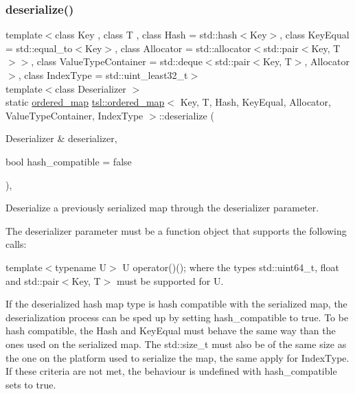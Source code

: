 \subsubsection{\texorpdfstring{deserialize()}{deserialize()}}
{\footnotesize\ttfamily template$<$class Key , class T , class Hash  = std\+::hash$<$\+Key$>$, class Key\+Equal  = std\+::equal\+\_\+to$<$\+Key$>$, class Allocator  = std\+::allocator$<$std\+::pair$<$\+Key, T$>$$>$, class Value\+Type\+Container  = std\+::deque$<$std\+::pair$<$\+Key, T$>$, Allocator$>$, class Index\+Type  = std\+::uint\+\_\+least32\+\_\+t$>$ \\
template$<$class Deserializer $>$ \\
static \mbox{\hyperlink{classtsl_1_1ordered__map}{ordered\+\_\+map}} \mbox{\hyperlink{classtsl_1_1ordered__map}{tsl\+::ordered\+\_\+map}}$<$ Key, T, Hash, Key\+Equal, Allocator, Value\+Type\+Container, Index\+Type $>$\+::deserialize (\begin{DoxyParamCaption}\item[{Deserializer \&}]{deserializer,  }\item[{bool}]{hash\+\_\+compatible = {\ttfamily false} }\end{DoxyParamCaption})\hspace{0.3cm}{\ttfamily [inline]}, {\ttfamily [static]}}

Deserialize a previously serialized map through the {\ttfamily deserializer} parameter.

The {\ttfamily deserializer} parameter must be a function object that supports the following calls\+:
\begin{DoxyItemize}
\item {\ttfamily template$<$typename U$>$ U operator()();} where the types {\ttfamily std\+::uint64\+\_\+t}, {\ttfamily float} and {\ttfamily std\+::pair$<$Key, T$>$} must be supported for U.
\end{DoxyItemize}

If the deserialized hash map type is hash compatible with the serialized map, the deserialization process can be sped up by setting {\ttfamily hash\+\_\+compatible} to true. To be hash compatible, the Hash and Key\+Equal must behave the same way than the ones used on the serialized map. The {\ttfamily std\+::size\+\_\+t} must also be of the same size as the one on the platform used to serialize the map, the same apply for {\ttfamily Index\+Type}. If these criteria are not met, the behaviour is undefined with {\ttfamily hash\+\_\+compatible} sets to true.

